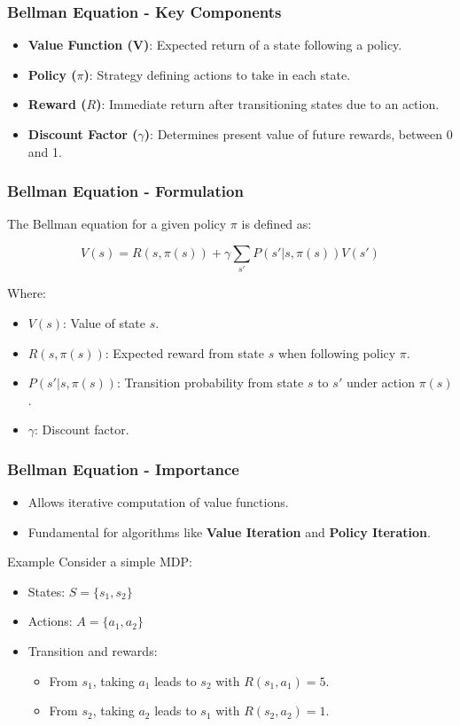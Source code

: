 \documentclass[aspectratio=169]{beamer}
\begin{document}
\begin{frame}[fragile]
  \frametitle{Bellman Equation - Key Components}
  \begin{itemize}
    \item \textbf{Value Function (V)}: Expected return of a state following a policy.
    \item \textbf{Policy ($\pi$)}: Strategy defining actions to take in each state.
    \item \textbf{Reward ($R$)}: Immediate return after transitioning states due to an action.
    \item \textbf{Discount Factor ($\gamma$)}: Determines present value of future rewards, between 0 and 1.
  \end{itemize}
\end{frame}

\begin{frame}[fragile]
  \frametitle{Bellman Equation - Formulation}
  The Bellman equation for a given policy $\pi$ is defined as:
  
  \begin{equation}
    V(s) = R(s, \pi(s)) + \gamma \sum_{s'} P(s'|s, \pi(s)) V(s')
  \end{equation}
  
  Where:
  \begin{itemize}
    \item $V(s)$: Value of state $s$.
    \item $R(s, \pi(s))$: Expected reward from state $s$ when following policy $\pi$.
    \item $P(s'|s, \pi(s))$: Transition probability from state $s$ to $s'$ under action $\pi(s)$.
    \item $\gamma$: Discount factor.
  \end{itemize}
\end{frame}

\begin{frame}[fragile]
  \frametitle{Bellman Equation - Importance}
  \begin{itemize}
    \item Allows iterative computation of value functions.
    \item Fundamental for algorithms like \textbf{Value Iteration} and \textbf{Policy Iteration}.
  \end{itemize}
  
  \begin{block}{Example}
    Consider a simple MDP:
    \begin{itemize}
      \item States: $S = \{s_1, s_2\}$
      \item Actions: $A = \{a_1, a_2\}$
      \item Transition and rewards:
        \begin{itemize}
          \item From $s_1$, taking $a_1$ leads to $s_2$ with $R(s_1, a_1) = 5$.
          \item From $s_2$, taking $a_2$ leads to $s_1$ with $R(s_2, a_2) = 1$.
        \end{itemize}
    \end{itemize}
  \end{block}
\end{frame}
\end{document}
